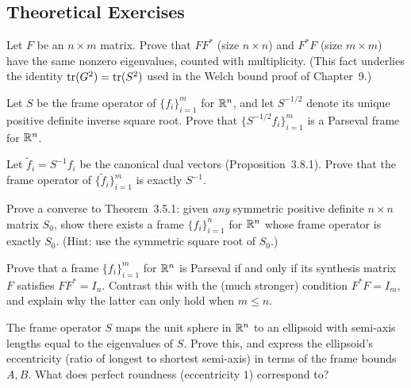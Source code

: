 \subsection*{Theoretical Exercises}
\begin{theoexercises}
	\item Let $F$ be an $n\times m$ matrix. Prove that $FF^*$ (size
	$n\times n$) and $F^*F$ (size $m\times m$) have the same nonzero
	eigenvalues, counted with multiplicity. (This fact underlies the
	identity $\operatorname{tr}(G^2)=\operatorname{tr}(S^2)$ used in the Welch bound proof of
	Chapter~9.)
	
	\item Let $S$ be the frame operator of $\{f_i\}_{i=1}^m$ for $\mathbb{R}^n$,
	and let $S^{-1/2}$ denote its unique positive definite inverse
	square root. Prove that $\{S^{-1/2}f_i\}_{i=1}^m$ is a Parseval
	frame for $\mathbb{R}^n$.
	
	\item Let $\tilde f_i=S^{-1}f_i$ be the canonical dual vectors
	(Proposition~3.8.1). Prove that the frame operator of
	$\{\tilde f_i\}_{i=1}^m$ is exactly $S^{-1}$.
	
	\item Prove a converse to Theorem~3.5.1: given \emph{any} symmetric
	positive definite $n\times n$ matrix $S_0$, show there exists a
	frame $\{f_i\}_{i=1}^n$ for $\mathbb{R}^n$ whose frame operator is exactly
	$S_0$. (Hint: use the symmetric square root of $S_0$.)
	
	\item Prove that a frame $\{f_i\}_{i=1}^m$ for $\mathbb{R}^n$ is Parseval if and
	only if its synthesis matrix $F$ satisfies $FF^*=I_n$. Contrast
	this with the (much stronger) condition $F^*F=I_m$, and explain
	why the latter can only hold when $m\le n$.
	
	\item The frame operator $S$ maps the unit sphere in $\mathbb{R}^n$ to an
	ellipsoid with semi-axis lengths equal to the eigenvalues of $S$.
	Prove this, and express the ellipsoid's eccentricity (ratio of
	longest to shortest semi-axis) in terms of the frame bounds $A,B$.
	What does perfect roundness (eccentricity $1$) correspond to?
\end{theoexercises}

